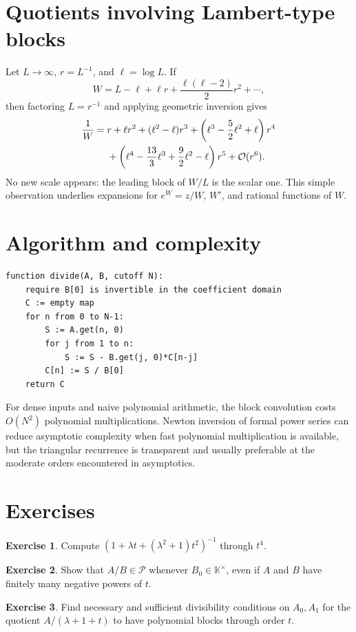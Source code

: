 \documentclass[11pt,openany]{book}
\theoremstyle{definition}
\newtheorem{exercise}{Exercise}[chapter]
\theoremstyle{plain}
\theoremstyle{remark}
\newcommand{\K}{\mathbb{K}}
\newcommand{\Plog}{\mathscr{P}}
\newcommand{\bigO}{\mathcal{O}}
\begin{document}
\section{Quotients involving Lambert-type blocks}
Let \(L\to\infty\), \(r=L^{-1}\), and \(\ell=\log L\). If
\[
 W=L-\ell+\ell r+\frac{\ell(\ell-2)}2r^2+\cdots,
\]
then factoring \(L=r^{-1}\) and applying geometric inversion gives
\begin{align}
 \frac1W={}&r+\ell r^2+(\ell^2-\ell)r^3
 +\left(\ell^3-\frac52\ell^2+\ell\right)r^4\notag\\
 &+\left(\ell^4-\frac{13}{3}\ell^3+\frac92\ell^2-\ell\right)r^5
 +\bigO(r^6).
\label{eq:reciprocal-W-preview}
\end{align}
No new scale appears: the leading block of \(W/L\) is the scalar one. This simple observation underlies expansions for \(e^W=z/W\), \(W'\), and rational functions of \(W\).

\section{Algorithm and complexity}
\begin{lstlisting}[style=pseudo,caption={Triangular block division}]
function divide(A, B, cutoff N):
    require B[0] is invertible in the coefficient domain
    C := empty map
    for n from 0 to N-1:
        S := A.get(n, 0)
        for j from 1 to n:
            S := S - B.get(j, 0)*C[n-j]
        C[n] := S / B[0]
    return C
\end{lstlisting}
For dense inputs and naive polynomial arithmetic, the block convolution costs \(O(N^2)\) polynomial multiplications. Newton inversion of formal power series can reduce asymptotic complexity when fast polynomial multiplication is available, but the triangular recurrence is transparent and usually preferable at the moderate orders encountered in asymptotics.

\section{Exercises}
\begin{exercise}
Compute \((1+\lambda t+(\lambda^2+1)t^2)^{-1}\) through \(t^4\).
\end{exercise}
\begin{exercise}
Show that \(A/B\in\Plog\) whenever \(B_0\in\K^\times\), even if \(A\) and \(B\) have finitely many negative powers of \(t\).
\end{exercise}
\begin{exercise}
Find necessary and sufficient divisibility conditions on \(A_0,A_1\) for the quotient \(A/(\lambda+1+t)\) to have polynomial blocks through order \(t\).
\end{exercise}
\end{document}
